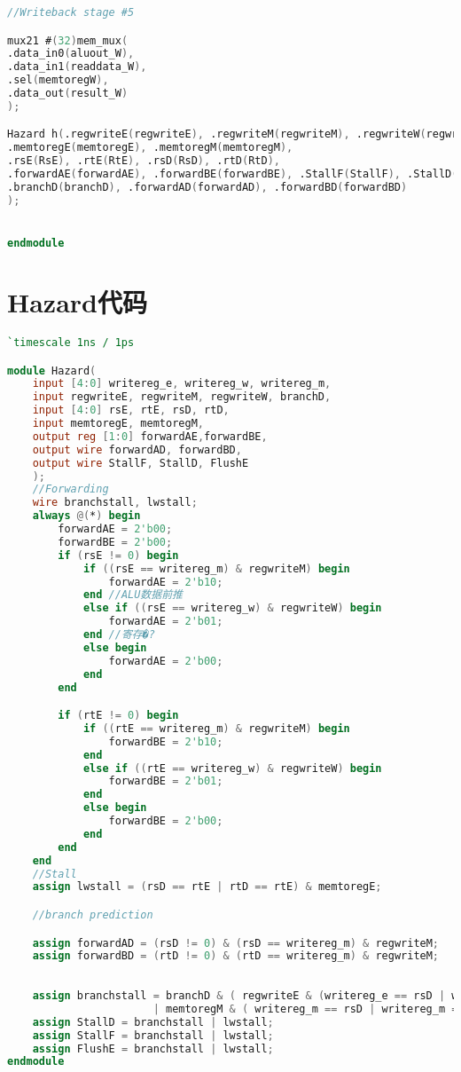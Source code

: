 \begin{lstlisting}[language=Verilog,frame=single]
//Writeback stage #5

mux21 #(32)mem_mux(
.data_in0(aluout_W),
.data_in1(readdata_W),
.sel(memtoregW),
.data_out(result_W)
);

Hazard h(.regwriteE(regwriteE), .regwriteM(regwriteM), .regwriteW(regwriteW), .writereg_e(WriteregE), .writereg_w(WriteregW), .writereg_m(WriteregM), 
.memtoregE(memtoregE), .memtoregM(memtoregM),
.rsE(RsE), .rtE(RtE), .rsD(RsD), .rtD(RtD),
.forwardAE(forwardAE), .forwardBE(forwardBE), .StallF(StallF), .StallD(StallD), .FlushE(FlushE),
.branchD(branchD), .forwardAD(forwardAD), .forwardBD(forwardBD)
);


endmodule
\end{lstlisting}

\section{Hazard代码}
\begin{lstlisting}[language=Verilog,frame=single]
`timescale 1ns / 1ps

module Hazard(
    input [4:0] writereg_e, writereg_w, writereg_m,
    input regwriteE, regwriteM, regwriteW, branchD, 
    input [4:0] rsE, rtE, rsD, rtD,
    input memtoregE, memtoregM,
    output reg [1:0] forwardAE,forwardBE,
    output wire forwardAD, forwardBD,
    output wire StallF, StallD, FlushE
    );
    //Forwarding
    wire branchstall, lwstall;
    always @(*) begin
        forwardAE = 2'b00;
        forwardBE = 2'b00;
        if (rsE != 0) begin 
            if ((rsE == writereg_m) & regwriteM) begin
                forwardAE = 2'b10;
            end //ALU数据前推
            else if ((rsE == writereg_w) & regwriteW) begin
                forwardAE = 2'b01;
            end //寄存�?
            else begin
                forwardAE = 2'b00;
            end
        end

        if (rtE != 0) begin
            if ((rtE == writereg_m) & regwriteM) begin
                forwardBE = 2'b10;
            end
            else if ((rtE == writereg_w) & regwriteW) begin
                forwardBE = 2'b01;
            end
            else begin
                forwardBE = 2'b00;
            end
        end
    end
    //Stall
    assign lwstall = (rsD == rtE | rtD == rtE) & memtoregE;

    //branch prediction

    assign forwardAD = (rsD != 0) & (rsD == writereg_m) & regwriteM;
    assign forwardBD = (rtD != 0) & (rtD == writereg_m) & regwriteM;
    
    
    assign branchstall = branchD & ( regwriteE & (writereg_e == rsD | writereg_e == rtD)
                       | memtoregM & ( writereg_m == rsD | writereg_m == rtD )); 
    assign StallD = branchstall | lwstall;
    assign StallF = branchstall | lwstall;
    assign FlushE = branchstall | lwstall;    
endmodule

\end{lstlisting}

